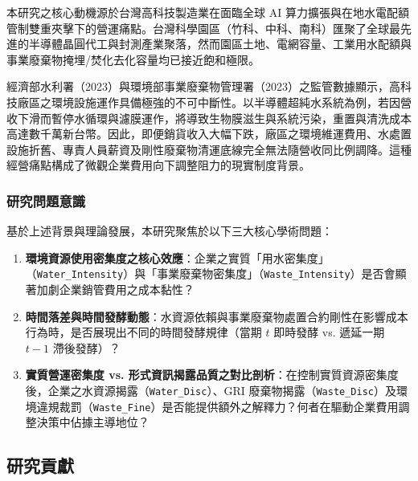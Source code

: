 \documentclass[12pt,a4paper]{article}
\begin{document}
本研究之核心動機源於台灣高科技製造業在面臨全球 AI 算力擴張與在地水電配額管制雙重夾擊下的營運痛點。台灣科學園區（竹科、中科、南科）匯聚了全球最先進的半導體晶圓代工與封測產業聚落，然而園區土地、電網容量、工業用水配額與事業廢棄物掩埋/焚化去化容量均已接近飽和極限。

經濟部水利署（2023）與環境部事業廢棄物管理署（2023）之監管數據顯示，高科技廠區之環境設施運作具備極強的不可中斷性。以半導體超純水系統為例，若因營收下滑而暫停水循環與濾膜運作，將導致生物膜滋生與系統污染，重置與清洗成本高達數千萬新台幣。因此，即便銷貨收入大幅下跌，廠區之環境維運費用、水處置設施折舊、專責人員薪資及剛性廢棄物清運底線完全無法隨營收同比例調降。這種經營痛點構成了微觀企業費用向下調整阻力的現實制度背景。

\subsubsection{研究問題意識}

基於上述背景與理論發展，本研究聚焦於以下三大核心學術問題：
\begin{enumerate}[leftmargin=*]
    \item \textbf{環境資源使用密集度之核心效應}：企業之實質「用水密集度」（\texttt{Water\_Intensity}）與「事業廢棄物密集度」（\texttt{Waste\_Intensity}）是否會顯著加劇企業銷管費用之成本黏性？
    \item \textbf{時間落差與時間發酵動態}：水資源依賴與事業廢棄物處置合約剛性在影響成本行為時，是否展現出不同的時間發酵規律（當期 $t$ 即時發酵 vs. 遞延一期 $t-1$ 滯後發酵）？
    \item \textbf{實質營運密集度 vs. 形式資訊揭露品質之對比剖析}：在控制實質資源密集度後，企業之水資源揭露（\texttt{Water\_Disc}）、GRI 廢棄物揭露（\texttt{Waste\_Disc}）及環境違規裁罰（\texttt{Waste\_Fine}）是否能提供額外之解釋力？何者在驅動企業費用調整決策中佔據主導地位？
\end{enumerate}

\subsection{研究貢獻}
\end{document}
